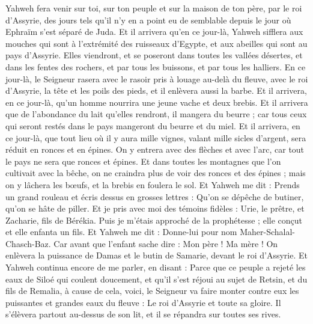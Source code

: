 \begin{multicols}{2}
Yahweh fera venir sur toi, sur ton peuple et sur la maison de ton père, par le roi d'Assyrie, des jours tels qu'il n'y en a point eu de semblable depuis le jour où Ephraïm s'est séparé de Juda.
Et il arrivera qu'en ce jour-là, Yahweh sifflera aux mouches qui sont à l'extrémité des ruisseaux d'Egypte, et aux abeilles qui sont au pays d'Assyrie.
Elles viendront, et se poseront dans toutes les vallées désertes, et dans les fentes des rochers, et par tous les buissons, et par tous les halliers.
En ce jour-là, le Seigneur rasera avec le rasoir pris à louage au-delà du fleuve, avec le roi d'Assyrie, la tête et les poils des pieds, et il enlèvera aussi la barbe.
Et il arrivera, en ce jour-là, qu'un homme nourrira une jeune vache et deux brebis.
Et il arrivera que de l'abondance du lait qu'elles rendront, il mangera du beurre ; car tous ceux qui seront restés dans le pays mangeront du beurre et du miel.
Et il arrivera, en ce jour-là, que tout lieu où il y aura mille vignes, valant mille sicles d'argent, sera réduit en ronces et en épines.
On y entrera avec des flèches et avec l'arc, car tout le pays ne sera que ronces et épines.
Et dans toutes les montagnes que l'on cultivait avec la bêche, on ne craindra plus de voir des ronces et des épines ; mais on y lâchera les bœufs, et la brebis en foulera le sol.
\VerseOne{}Et Yahweh me dit : Prends un grand rouleau et écris dessus en grosses lettres : Qu'on se dépêche de butiner, qu'on se hâte de piller.
Et je pris avec moi des témoins fidèles : Urie, le prêtre, et Zacharie, fils de Bérékia.
Puis je m'étais approché de la prophétesse ; elle conçut et elle enfanta un fils. Et Yahweh me dit : Donne-lui pour nom Maher-Schalal-Chasch-Baz.
Car avant que l'enfant sache dire : Mon père ! Ma mère ! On enlèvera la puissance de Damas et le butin de Samarie, devant le roi d'Assyrie.
Et Yahweh continua encore de me parler, en disant :
Parce que ce peuple a rejeté les eaux de Siloé qui coulent doucement, et qu'il s'est réjoui au sujet de Retsin, et du fils de Remalia,
à cause de cela, voici, le Seigneur va faire monter contre eux les puissantes et grandes eaux du fleuve : Le roi d'Assyrie et toute sa gloire. Il s'élèvera partout au-dessus de son lit, et il se répandra sur toutes ses rives.

\end{multicols}
